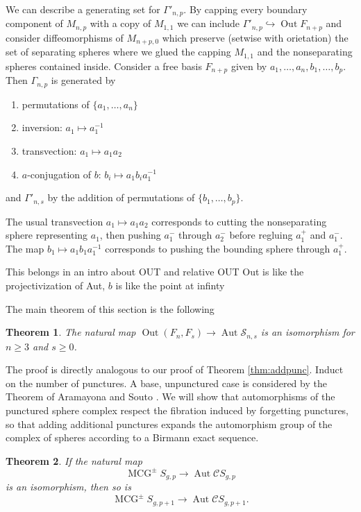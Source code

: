 \documentclass[11pt]{article}
\DeclareMathOperator{\oout}{Out}
\DeclareMathOperator{\mcg}{MCG}
\DeclareMathOperator{\aaut}{Aut}
\newtheorem{theorem}{Theorem}
\theoremstyle{remark}
\theoremstyle{definition}
\begin{document}
We can describe a generating set for $\Gamma'_{n,p}$.
By capping every boundary component of
$M_{n,p}$ with a copy of $M_{1,1}$
we can include
 $\Gamma'_{n,p} \hookrightarrow \oout F_{n+p}$
and consider diffeomorphisms of $M_{n+p,0}$
which preserve (setwise with orietation) the set of separating spheres
where we glued the capping $M_{1,1}$ and the nonseparating spheres contained inside.
Consider a free basis $F_{n+p}$
given by $a_1,\ldots, a_n, b_1, \ldots, b_p$.
Then $\Gamma_{n,p}$ is generated by
\begin{enumerate}
  \item permutations of $\{a_1, \ldots, a_n\}$
  \item inversion: $a_1 \mapsto a_1^{-1}$
  \item transvection: $a_1 \mapsto a_1a_2$
  \item $a$-conjugation of $b$: $b_i \mapsto a_1b_ia_1^{-1}$
\end{enumerate}
and $\Gamma'_{n,s}$ by the addition of permutations of $\{b_1, \ldots, b_p\}$.

The usual transvection  $a_1 \mapsto a_1a_2$ corresponds to cutting the nonseparating sphere
representing $a_1$, then pushing $a_1^-$ through $a_2^-$ before regluing
$a_1^+$ and $a_1^-$.
The map $b_1 \mapsto a_1b_1a_1^{-1}$ corresponds to pushing the
bounding sphere through $a_1^+$.





This belongs in an intro about OUT and relative OUT
Out is like the projectivization of Aut, $b$ is like the point at infinty



The main theorem of this section is the following

\begin{theorem}
The natural map
$\oout (F_n,F_s) \to \aaut \mathcal S_{n,s}$ is an isomorphism for $n\geq 3$ and $s \geq 0$.
\end{theorem}

The proof is directly analogous to our proof of Theorem
\ref{thm:addpunc}.
Induct on the number of punctures.
A base, unpunctured case is considered by the Theorem of Aramayona and Souto \cite{souto}.
We will show that automorphisms of the punctured sphere complex
respect the fibration induced by forgetting punctures,
so that adding additional punctures expands the automorphism group
of the complex of spheres according to a Birmann exact sequence.

\begin{theorem}
  If the natural map
  $$
  \mcg^\pm S_{g,p} \to  \aaut \mathcal C S_{g,p}
  $$
  is an isomorphism, then so is
  $$
  \mcg^\pm S_{g,p+1} \to  \aaut \mathcal C S_{g,p+1}.
  $$
  \label{thm:outpunc}
\end{theorem}
\end{document}
